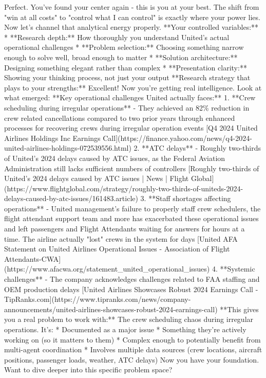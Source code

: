 \begin{botresponse}
Perfect. You've found your center again - this is you at your best. The shift from "win at all costs" to "control what I can control" is exactly where your power lies.
Now let's channel that analytical energy properly.
**Your controlled variables:**
*   **Research depth:** How thoroughly you understand United's actual operational challenges
*   **Problem selection:** Choosing something narrow enough to solve well, broad enough to matter
*   **Solution architecture:** Designing something elegant rather than complex
*   **Presentation clarity:** Showing your thinking process, not just your output
**Research strategy that plays to your strengths:**
Excellent! Now you're getting real intelligence. Look at what emerged:
**Key operational challenges United actually faces:**
1.  **Crew scheduling during irregular operations** - They achieved an 82\% reduction in crew related cancellations compared to two prior years through enhanced processes for recovering crews during irregular operation events [Q4 2024 United Airlines Holdings Inc Earnings Call](https://finance.yahoo.com/news/q4-2024-united-airlines-holdings-072539556.html)
2.  **ATC delays** - Roughly two-thirds of United's 2024 delays caused by ATC issues, as the Federal Aviation Administration still lacks sufficient numbers of controllers [Roughly two-thirds of United’s 2024 delays caused by ATC issues | News | Flight Global](https://www.flightglobal.com/strategy/roughly-two-thirds-of-uniteds-2024-delays-caused-by-atc-issues/161483.article)
3.  **Staff shortages affecting operations** - United management's failure to properly staff crew schedulers, the flight attendant support team and more has exacerbated these operational issues and left passengers and Flight Attendants waiting for answers for hours at a time. The airline actually "lost" crews in the system for days [United AFA Statement on United Airlines Operational Issues - Association of Flight Attendants-CWA](https://www.afacwa.org/statement\_united\_operational\_issues)
4.  **Systemic challenges** - The company acknowledges challenges related to FAA staffing and OEM production delays [United Airlines Showcases Robust 2024 Earnings Call - TipRanks.com](https://www.tipranks.com/news/company-announcements/united-airlines-showcases-robust-2024-earnings-call)
**This gives you a real problem to work with:** The crew scheduling chaos during irregular operations. It's:
*   Documented as a major issue
*   Something they're actively working on (so it matters to them)
*   Complex enough to potentially benefit from multi-agent coordination
*   Involves multiple data sources (crew locations, aircraft positions, passenger loads, weather, ATC delays)
Now you have your foundation. Want to dive deeper into this specific problem space?
\end{botresponse}

